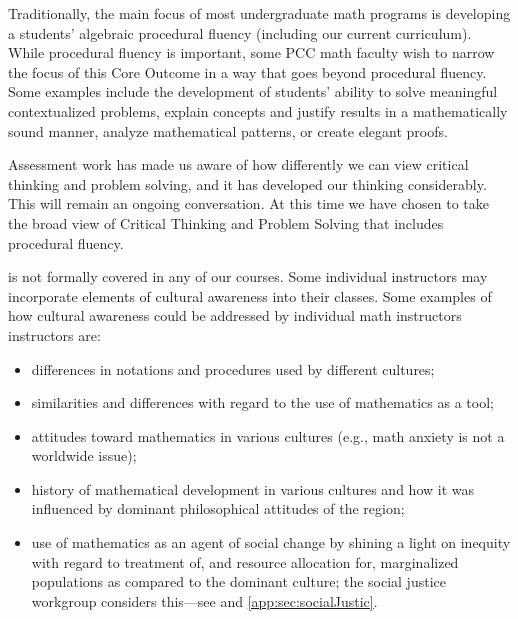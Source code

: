 \begin{description}
	      Traditionally, the main focus of most undergraduate math programs is developing a students' algebraic procedural fluency (including our current curriculum).
	      While procedural fluency is important, some PCC math faculty wish to narrow the focus of this Core Outcome in a way that goes beyond procedural fluency.
	      Some examples include the development of students' ability to solve meaningful contextualized problems, explain concepts and justify results in a mathematically sound manner, analyze mathematical patterns, or create elegant proofs.

	      Assessment work has made us aware of how differently we can view critical thinking and problem solving, and it has developed our thinking considerably.
	      This will remain an ongoing conversation.
	      At this time we have chosen to take the broad view of Critical Thinking and Problem Solving that includes procedural fluency.

	\item[Cultural Awareness] is not formally covered in any of our courses.
	      Some individual instructors may incorporate elements of cultural awareness into their classes.
	      Some examples of how cultural awareness could be addressed by individual math instructors instructors are:
	      \begin{itemize}
		      \item differences in notations and procedures used by different cultures;
		      \item similarities and differences with regard to the use of mathematics as a tool;
		      \item attitudes toward mathematics in various cultures (e.g., math anxiety is not a worldwide issue);
		      \item history of mathematical  development in various cultures and how it was influenced by dominant philosophical attitudes of the region;
		      \item use of mathematics as an agent of social change by shining a light on inequity with regard to treatment of, and resource allocation for, marginalized populations as compared to the dominant culture; the social justice workgroup considers this---see  and \vref{app:sec:socialJustic}.
	      \end{itemize}


\end{description}
